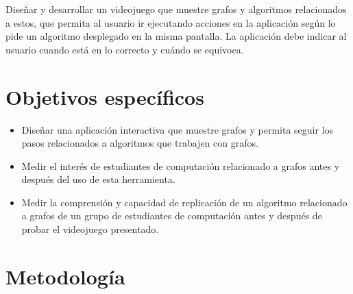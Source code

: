 \documentclass[submission]{eptcs}
\begin{document}
Diseñar y desarrollar un videojuego que muestre grafos y algoritmos relacionados a estos,
que permita al usuario ir ejecutando acciones en la aplicación según lo pide un algoritmo
desplegado en la misma pantalla. La aplicación debe indicar al usuario cuando está en lo
correcto y cuándo se equivoca.

\section{Objetivos específicos}

\begin{itemize}
\item Diseñar una aplicación interactiva que muestre grafos y permita seguir
los pasos relacionados a algoritmos que trabajen con grafos.

\item Medir el interés de estudiantes de computación relacionado a grafos
antes y después del uso de esta herramienta.

\item Medir la comprensión y capacidad de replicación de un algoritmo relacionado a grafos
de un grupo de estudiantes de computación antes y después de probar el videojuego presentado.

\end{itemize}

\section{Metodología}
\end{document}
